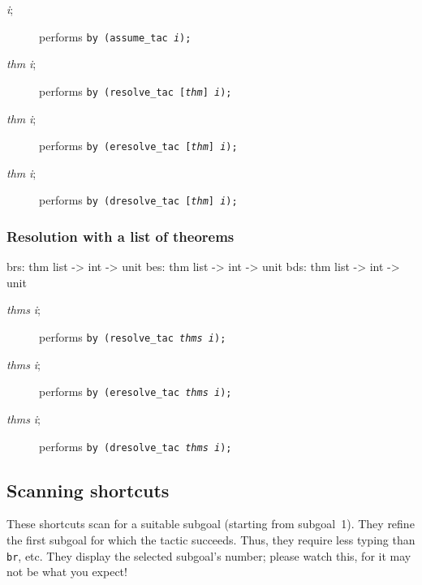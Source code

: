 \begin{description}
\item[ {\it i};] 
performs \hbox{\tt by (assume_tac {\it i});}

\item[ {\it thm} {\it i};] 
performs \hbox{\tt by (resolve_tac [{\it thm}] {\it i});}

\item[ {\it thm} {\it i};] 
performs \hbox{\tt by (eresolve_tac [{\it thm}] {\it i});}

\item[ {\it thm} {\it i};] 
performs \hbox{\tt by (dresolve_tac [{\it thm}] {\it i});}
\end{description}

\subsubsection{Resolution with a list of theorems}
\begin{ttbox} 
brs: thm list -> int -> unit
bes: thm list -> int -> unit
bds: thm list -> int -> unit
\end{ttbox}

\begin{description}
\item[ {\it thms} {\it i};] 
performs \hbox{\tt by (resolve_tac {\it thms} {\it i});}

\item[ {\it thms} {\it i};] 
performs \hbox{\tt by (eresolve_tac {\it thms} {\it i});}

\item[ {\it thms} {\it i};] 
performs \hbox{\tt by (dresolve_tac {\it thms} {\it i});}
\end{description}


\subsection{Scanning shortcuts}
These shortcuts scan for a suitable subgoal (starting from subgoal~1).
They refine the first subgoal for which the tactic succeeds.  Thus, they
require less typing than {\tt br}, etc.  They display the selected
subgoal's number; please watch this, for it may not be what you expect!

